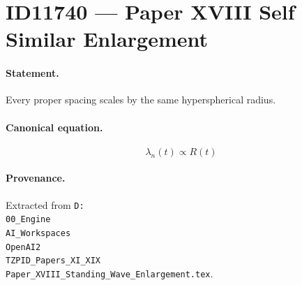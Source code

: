 \section*{ID11740 --- Paper XVIII Self Similar Enlargement}

\paragraph{Statement.}
Every proper spacing scales by the same hyperspherical radius.

\paragraph{Canonical equation.}
\[
\lambda_n(t)\propto R(t)
\]

\paragraph{Provenance.}
Extracted from \texttt{D:\\00\_Engine\\AI\_Workspaces\\OpenAI2\\TZPID\_Papers\_XI\_XIX\\Paper\_XVIII\_Standing\_Wave\_Enlargement.tex}.
